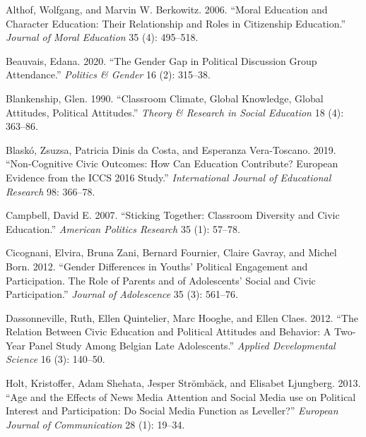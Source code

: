 \documentclass[
  letterpaper,
  DIV=11,
  numbers=noendperiod]{scrreprt}
\newlength{\cslhangindent}
\newlength{\cslentryspacingunit} %
\newenvironment{CSLReferences}[2] %
 {%
  \setlength{\parindent}{0pt}
  \ifodd #1
  \let\oldpar\par
  \def\par{\hangindent=\cslhangindent\oldpar}
  \fi
  \setlength{\parskip}{#2\cslentryspacingunit}
 }%
 {}
\begin{document}
\hypertarget{refs-6}{}
\begin{CSLReferences}{1}{0}
\leavevmode{}%
Althof, Wolfgang, and Marvin W. Berkowitz. 2006. {``{Moral Education and
Character Education: Their Relationship and Roles in Citizenship
Education}.''} \emph{Journal of Moral Education} 35 (4): 495--518.

\leavevmode{}%
Beauvais, Edana. 2020. {``{The Gender Gap in Political Discussion Group
Attendance}.''} \emph{Politics \& Gender} 16 (2): 315--38.

\leavevmode{}%
Blankenship, Glen. 1990. {``{Classroom Climate, Global Knowledge, Global
Attitudes, Political Attitudes}.''} \emph{Theory \& Research in Social
Education} 18 (4): 363--86.

\leavevmode{}%
Blaskó, Zsuzsa, Patricia Dinis da Costa, and Esperanza Vera-Toscano.
2019. {``{Non-Cognitive Civic Outcomes: How Can Education Contribute?
European Evidence from the ICCS 2016 Study}.''} \emph{{International
Journal of Educational Research}} 98: 366--78.

\leavevmode{}%
Campbell, David E. 2007. {``{Sticking Together: Classroom Diversity and
Civic Education}.''} \emph{American Politics Research} 35 (1): 57--78.

\leavevmode{}%
Cicognani, Elvira, Bruna Zani, Bernard Fournier, Claire Gavray, and
Michel Born. 2012. {``{Gender Differences in Youths' Political
Engagement and Participation. The Role of Parents and of Adolescents'
Social and Civic Participation}.''} \emph{Journal of Adolescence} 35
(3): 561--76.

\leavevmode{}%
Dassonneville, Ruth, Ellen Quintelier, Marc Hooghe, and Ellen Claes.
2012. {``{The Relation Between Civic Education and Political Attitudes
and Behavior: A Two-Year Panel Study Among Belgian Late Adolescents}.''}
\emph{Applied Developmental Science} 16 (3): 140--50.

\leavevmode{}%
Holt, Kristoffer, Adam Shehata, Jesper Strömbäck, and Elisabet
Ljungberg. 2013. {``{Age and the Effects of News Media Attention and
Social Media use on Political Interest and Participation: Do Social
Media Function as Leveller?}''} \emph{European Journal of Communication}
28 (1): 19--34.


\end{CSLReferences}
\end{document}
